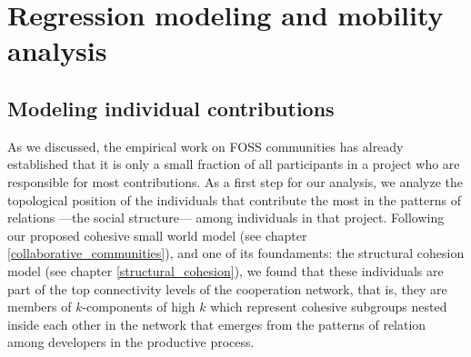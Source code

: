 \section{Regression modeling and mobility analysis}

\subsection{Modeling individual contributions}

As we discussed, the empirical work on FOSS communities has already established that it is only a small fraction of all participants in a project who are responsible for most contributions. As a first step for our analysis, we analyze the topological position of the individuals that contribute the most in the patterns of relations ---the social structure--- among individuals in that project. Following our proposed cohesive small world model (see chapter \ref{collaborative_communities}), and one of its foundaments: the structural cohesion model \citep{moody:2003} (see chapter \ref{structural_cohesion}), we found that these individuals are part of the top connectivity levels of the cooperation network, that is, they are members of $k$-components of high $k$ which represent cohesive subgroups nested inside each other in the network that emerges from the patterns of relation among developers in the productive process. 

